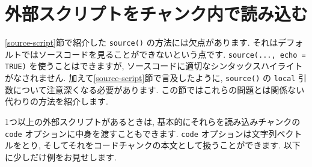 \documentclass[
  11pt,
]{bxjsreport}
\begin{document}
\hypertarget{option-code}{%
\section{外部スクリプトをチャンク内で読み込む}\label{option-code}}

\ref{source-script}節で紹介した \texttt{source()} の方法には欠点があります. それはデフォルトではソースコードを見ることができないという点です. \texttt{source(..., echo = TRUE)} を使うことはできますが, ソースコードに適切なシンタックスハイライトがなされません. 加えて\ref{source-script}節で言及したように, \texttt{source()} の \texttt{local} 引数について注意深くなる必要があります. この節ではこれらの問題とは関係ない代わりの方法を紹介します.

1つ以上の外部スクリプトがあるときは, 基本的にそれらを読み込みチャンクの \texttt{code} オプションに中身を渡すこともできます. \texttt{code} オプションは文字列ベクトルをとり, そしてそれをコードチャンクの本文として扱うことができます. 以下に少しだけ例をお見せします.
\end{document}
